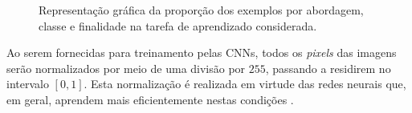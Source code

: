 \begin{figure}[h!]
	\centering
	\caption{Representação gráfica da proporção dos exemplos por abordagem, classe e finalidade na tarefa de aprendizado considerada.}
	\hfill
	\label{fig:divisao-dados}
\end{figure}

Ao serem fornecidas para treinamento pelas CNNs, todos os \emph{pixels} das imagens serão normalizados por meio de uma divisão por $255$, passando a residirem no intervalo $[0,1]$. Esta normalização é realizada em virtude das redes neurais que, em geral, aprendem mais eficientemente nestas condições \cite{chollet}.
